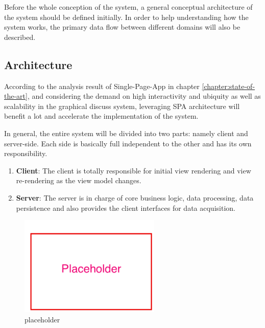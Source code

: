 Before the whole conception of the system, a general conceptual architecture of the system should be defined initially. In order to help understanding how the system works, the primary data flow between different domains will also be described.

\subsection{Architecture} \label{sec:concept-general-architecture}
According to the analysis result of Single-Page-App in chapter \ref{chapter:state-of-the-art}, and considering the demand on high interactivity and ubiquity as well as scalability in the graphical discuss system, leveraging SPA architecture will benefit a lot and accelerate the implementation of the system. 

In general, the entire system will be divided into two parts: namely client and server-side. Each side is basically full independent to the other and has its own responsibility. 

\begin{enumerate}
\item
\textbf{Client}: The client is totally responsible for initial view rendering and view re-rendering as the view model changes. 
\item
\textbf{Server}: The server is in charge of core business logic, data processing, data persistence and also provides the client interfaces for data acquisition.
\end{enumerate}

\begin{figure}[!htbp]
  \centering
    \includegraphics[width=0.6\textwidth]{Figures/placeholder.png}
  \caption{placeholder}
  \label{fig:general-architecture-concept}
\end{figure}

